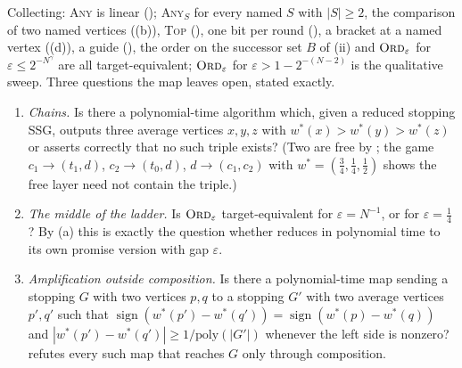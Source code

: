 \begin{remark}\label{rem:wo-map}
Collecting: \textsc{Any} is linear ();
\textsc{Any}$_S$ for every named $S$ with $|S|\ge2$, the comparison of two
named vertices ((b)), \textsc{Top} (),
one bit per round (), a bracket at a named vertex
((d)), a guide (), the order on the successor
set $B$ of (ii) and $\textsc{Ord}_\varepsilon$ for
$\varepsilon\le2^{-N^{\gamma}}$ are all target-equivalent;
$\textsc{Ord}_\varepsilon$ for $\varepsilon>1-2^{-(N-2)}$ is the qualitative
sweep.
Three questions the map leaves open, stated exactly.
\begin{enumerate}[label=(\roman*),leftmargin=2.2em]
\item \emph{Chains.} Is there a polynomial-time algorithm which, given a
  reduced stopping SSG, outputs three average vertices $x,y,z$ with
  $w^\ast(x)>w^\ast(y)>w^\ast(z)$ or asserts correctly that no such triple
  exists? (Two are free by ; the game
  $c_1\to(t_1,d)$, $c_2\to(t_0,d)$, $d\to(c_1,c_2)$ with
  $w^\ast=(\tfrac34,\tfrac14,\tfrac12)$ shows the free layer need not contain
  the triple.)
\item \emph{The middle of the ladder.} Is $\textsc{Ord}_\varepsilon$
  target-equivalent for $\varepsilon=N^{-1}$, or for $\varepsilon=\tfrac14$?
  By (a) this is exactly the question whether
   reduces in polynomial time to its own promise version with
  gap $\varepsilon$.
\item \emph{Amplification outside composition.} Is there a polynomial-time map
  sending a stopping $G$ with two vertices $p,q$ to a stopping $G'$ with two
  average vertices $p',q'$ such that
  $\operatorname{sign}(w^\ast(p')-w^\ast(q'))=\operatorname{sign}(w^\ast(p)-w^\ast(q))$
  and $|w^\ast(p')-w^\ast(q')|\ge1/\mathrm{poly}(|G'|)$ whenever the left side
  is nonzero?  refutes every such map that reaches
  $G$ only through composition.
\end{enumerate}
\end{remark}